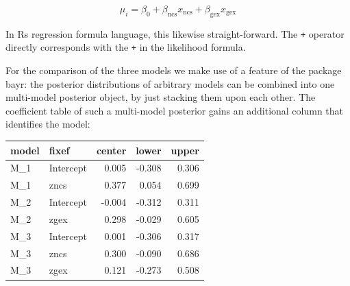 \documentclass[]{svmono}
\newenvironment{Shaded}{\begin{snugshade}}{\end{snugshade}}
\newcommand{\KeywordTok}[1]{\textcolor[rgb]{0.13,0.29,0.53}{\textbf{#1}}}
\newcommand{\DataTypeTok}[1]{\textcolor[rgb]{0.13,0.29,0.53}{#1}}
\newcommand{\DecValTok}[1]{\textcolor[rgb]{0.00,0.00,0.81}{#1}}
\newcommand{\StringTok}[1]{\textcolor[rgb]{0.31,0.60,0.02}{#1}}
\newcommand{\CommentTok}[1]{\textcolor[rgb]{0.56,0.35,0.01}{\textit{#1}}}
\newcommand{\OperatorTok}[1]{\textcolor[rgb]{0.81,0.36,0.00}{\textbf{#1}}}
\newcommand{\NormalTok}[1]{#1}
\theoremstyle{definition}
\theoremstyle{definition}
\theoremstyle{definition}
\theoremstyle{remark}
\begin{document}
\[
\mu_i = \beta_0 + \beta_\mathrm{ncs} x_\mathrm{ncs} + \beta_\mathrm{gex} x_\mathrm{gex}
\]

In Rs regression formula language, this likewise straight-forward. The
\texttt{+} operator directly corresponds with the \texttt{+} in the
likelihood formula.

\begin{Shaded}
\end{Shaded}

For the comparison of the three models we make use of a feature of the
package bayr: the posterior distributions of arbitrary models can be
combined into one multi-model posterior object, by just stacking them
upon each other. The coefficient table of such a multi-model posterior
gains an additional column that identifies the model:

\begin{Shaded}
\end{Shaded}

\begin{longtable}[]{@{}llrrr@{}}
\toprule
model & fixef & center & lower & upper\tabularnewline
\midrule
\endhead
M\_1 & Intercept & 0.005 & -0.308 & 0.306\tabularnewline
M\_1 & zncs & 0.377 & 0.054 & 0.699\tabularnewline
M\_2 & Intercept & -0.004 & -0.312 & 0.311\tabularnewline
M\_2 & zgex & 0.298 & -0.029 & 0.605\tabularnewline
M\_3 & Intercept & 0.001 & -0.306 & 0.317\tabularnewline
M\_3 & zncs & 0.300 & -0.090 & 0.686\tabularnewline
M\_3 & zgex & 0.121 & -0.273 & 0.508\tabularnewline
\bottomrule
\end{longtable}
\end{document}
